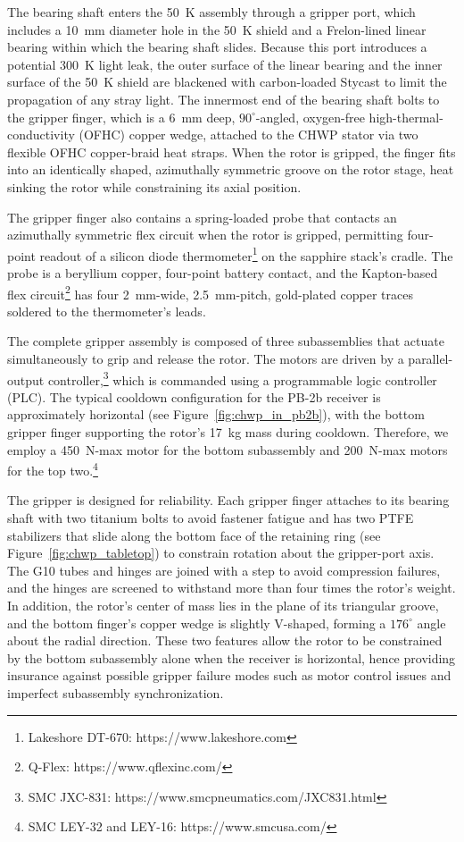 The bearing shaft enters the 50~K assembly through a gripper port, which includes a 10~mm diameter hole in the 50~K shield and a Frelon-lined linear bearing within which the bearing shaft slides. Because this port introduces a potential 300~K light leak, the outer surface of the linear bearing and the inner surface of the 50~K shield are blackened with carbon-loaded Stycast \cite{persky_review_1999} to limit the propagation of any stray light. The innermost end of the bearing shaft bolts to the gripper finger, which is a 6~mm deep, $90^{\circ}$-angled, oxygen-free high-thermal-conductivity (OFHC) copper wedge, attached to the CHWP stator via two flexible OFHC copper-braid heat straps. When the rotor is gripped, the finger fits into an identically shaped, azimuthally symmetric groove on the rotor stage, heat sinking the rotor while constraining its axial position.

The gripper finger also contains a spring-loaded probe that contacts an azimuthally symmetric flex circuit when the rotor is gripped, permitting four-point readout of a silicon diode thermometer\footnote{Lakeshore DT-670: https://www.lakeshore.com} on the sapphire stack's cradle. The probe is a beryllium copper, four-point battery contact, and the Kapton-based flex circuit\footnote{Q-Flex: https://www.qflexinc.com/} has four 2~mm-wide, 2.5~mm-pitch, gold-plated copper traces soldered to the thermometer's leads.

The complete gripper assembly is composed of three subassemblies that actuate simultaneously to grip and release the rotor. The motors are driven by a parallel-output controller,\footnote{SMC JXC-831: https://www.smcpneumatics.com/JXC831.html} which is commanded using a programmable logic controller (PLC). The typical cooldown configuration for the PB-2b receiver is approximately horizontal (see Figure~\ref{fig:chwp_in_pb2b}), with the bottom gripper finger supporting the rotor's 17~kg mass during cooldown. Therefore, we employ a 450~N-max motor for the bottom subassembly and 200~N-max motors for the top two.\footnote{SMC LEY-32 and LEY-16: https://www.smcusa.com/}

The gripper is designed for reliability. Each gripper finger attaches to its bearing shaft with two titanium bolts to avoid fastener fatigue and has two PTFE stabilizers that slide along the bottom face of the retaining ring (see Figure~\ref{fig:chwp_tabletop}) to constrain rotation about the gripper-port axis. The G10 tubes and hinges are joined with a step to avoid compression failures, and the hinges are screened to withstand more than four times the rotor's weight. In addition, the rotor's center of mass lies in the plane of its triangular groove, and the bottom finger's copper wedge is slightly V-shaped, forming a $176^{\circ}$ angle about the radial direction. These two features allow the rotor to be constrained by the bottom subassembly alone when the receiver is horizontal, hence providing insurance against possible gripper failure modes such as motor control issues and imperfect subassembly synchronization.

